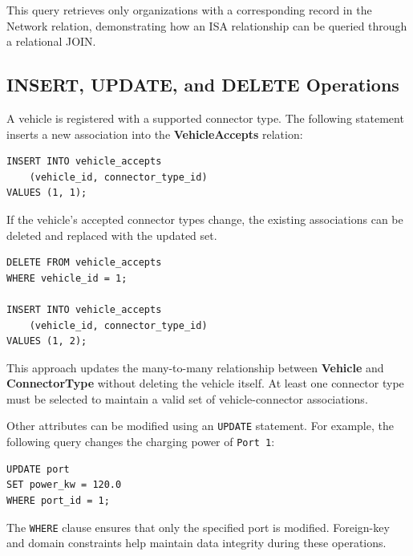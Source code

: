 \documentclass[sigconf,screen,nonacm]{acmart}
\begin{document}
This query retrieves only organizations with a corresponding record in the Network relation, demonstrating how an ISA relationship can be queried through a relational JOIN.

\subsection{INSERT, UPDATE, and DELETE Operations}
A vehicle is registered with a supported connector type. The following statement inserts a new association into the \textbf{VehicleAccepts} relation:

\begin{verbatim}
INSERT INTO vehicle_accepts
    (vehicle_id, connector_type_id)
VALUES (1, 1);
\end{verbatim}

If the vehicle's accepted connector types change, the existing associations can be deleted and replaced with the updated set.

\begin{verbatim}
DELETE FROM vehicle_accepts
WHERE vehicle_id = 1;

INSERT INTO vehicle_accepts
    (vehicle_id, connector_type_id)
VALUES (1, 2);
\end{verbatim}

This approach updates the many-to-many relationship between \textbf{Vehicle} and \textbf{ConnectorType} without deleting the vehicle itself. At least one connector type must be selected to maintain a valid set of vehicle-connector associations.

Other attributes can be modified using an \texttt{UPDATE} statement. For example, the following query changes the charging power of \texttt{Port 1}:

\begin{verbatim}
UPDATE port
SET power_kw = 120.0
WHERE port_id = 1;
\end{verbatim}

The \texttt{WHERE} clause ensures that only the specified port is modified. Foreign-key and domain constraints help maintain data integrity during these operations.
\end{document}

